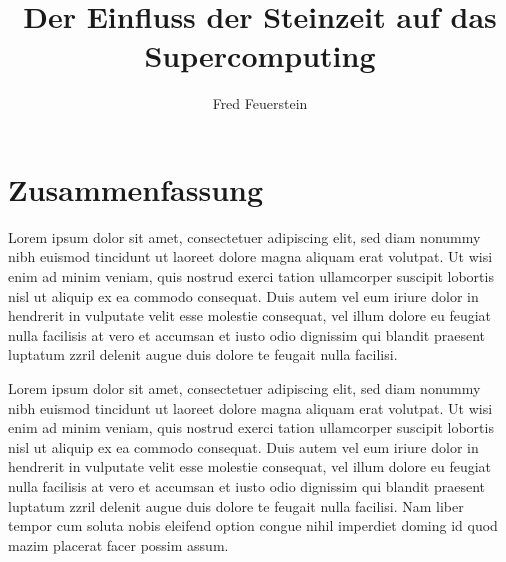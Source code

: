 \documentclass[12pt,a4paper,twoside]{report}
\begin{document}
\pagestyle{fancyplain} \thispagestyle{empty}

\author{Fred Feuerstein}
\title{Der Einfluss der Steinzeit auf das Supercomputing}

\maketitle
\newpage{\pagestyle{empty} \cleardoublepage}

\chapter*{Zusammenfassung}
Lorem ipsum dolor sit amet, consectetuer adipiscing elit, sed diam
nonummy nibh euismod tincidunt ut laoreet dolore magna aliquam erat
volutpat. Ut wisi enim ad minim veniam, quis nostrud exerci tation
ullamcorper suscipit lobortis nisl ut aliquip ex ea commodo
consequat. Duis autem vel eum iriure dolor in hendrerit in vulputate
velit esse molestie consequat, vel illum dolore eu feugiat nulla
facilisis at vero et accumsan et iusto odio dignissim qui blandit
praesent luptatum zzril delenit augue duis dolore te feugait nulla
facilisi.


Lorem ipsum dolor sit amet, consectetuer adipiscing elit, sed diam
nonummy nibh euismod tincidunt ut laoreet dolore magna aliquam erat
volutpat. Ut wisi enim ad minim veniam, quis nostrud exerci tation
ullamcorper suscipit lobortis nisl ut aliquip ex ea commodo
consequat. Duis autem vel eum iriure dolor in hendrerit in vulputate
velit esse molestie consequat, vel illum dolore eu feugiat nulla
facilisis at vero et accumsan et iusto odio dignissim qui blandit
praesent luptatum zzril delenit augue duis dolore te feugait nulla
facilisi. Nam liber tempor cum soluta nobis eleifend option congue
nihil imperdiet doming id quod mazim placerat facer possim assum.

\newpage{\pagestyle{empty} \cleardoublepage}

 \setcounter{page}{1}

\tableofcontents

\newpage{\pagestyle{empty} \cleardoublepage}

 \setcounter{page}{1}
\setlength{\parskip}{5pt}


\newpage{\pagestyle{empty} \cleardoublepage}

\begin{appendix}


\newpage{\pagestyle{empty} \cleardoublepage}

\end{appendix}

\listoftables

\listoffigures



\end{document}
